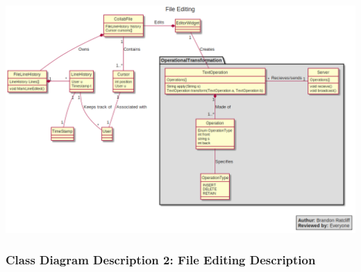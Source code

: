 \documentclass[twoside,letterpaper]{article}
\begin{document}
{\includegraphics[width=\textwidth]{images/ClassDiagrams/EditFile}

\newpage

\subsubsection[Class Diagram Description 2: File Editing Description]{\rmfamily\bfseries\color{black}
	Class Diagram Description 2: File Editing Description}
\hypertarget{RefHeading22059017292}{}

}
\end{document}
